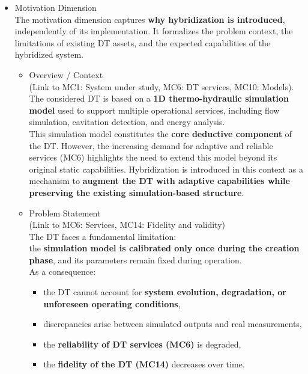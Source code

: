 \documentclass[
]{article}
\begin{document}
\begin{itemize}
\begin{itemize}
    \begin{itemize}
    \item
      Motivation Dimension\\
      The motivation dimension captures \textbf{why hybridization is
      introduced}, independently of its implementation. It formalizes
      the problem context, the limitations of existing DT assets, and
      the expected capabilities of the hybridized system.

      \begin{itemize}
      \item
        Overview / Context\\
        (Link to MC1: System under study, MC6: DT services, MC10:
        Models). The considered DT is based on a \textbf{1D
        thermo-hydraulic simulation model} used to support multiple
        operational services, including flow simulation, cavitation
        detection, and energy analysis.\\
        This simulation model constitutes the \textbf{core deductive
        component} of the DT. However, the increasing demand for
        adaptive and reliable services (MC6) highlights the need to
        extend this model beyond its original static capabilities.
        Hybridization is introduced in this context as a mechanism to
        \textbf{augment the DT with adaptive capabilities while
        preserving the existing simulation-based structure}.
      \item
        Problem Statement\\
        (Link to MC6: Services, MC14: Fidelity and validity)\\
        The DT faces a fundamental limitation:\\
        the \textbf{simulation model is calibrated only once during the
        creation phase}, and its parameters remain fixed during
        operation.\\
        As a consequence:

        \begin{itemize}
        \item
          the DT cannot account for \textbf{system evolution,
          degradation, or unforeseen operating conditions},
        \item
          discrepancies arise between simulated outputs and real
          measurements,
        \item
          the \textbf{reliability of DT services (MC6)} is degraded,
        \item
          the \textbf{fidelity of the DT (MC14)} decreases over time.


\end{itemize}
\end{itemize}
\end{itemize}
\end{itemize}
\end{itemize}
\end{document}
